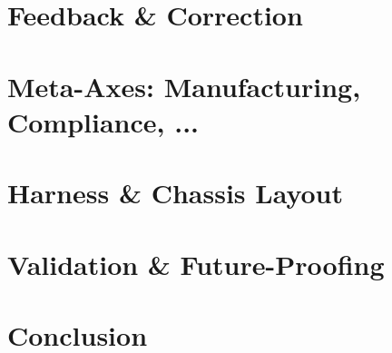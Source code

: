 \documentclass[12pt]{article}
\begin{document}
\section{Feedback \& Correction}


\section{Meta-Axes: Manufacturing, Compliance, ...}

\section{Harness \& Chassis Layout}

\section{Validation \& Future-Proofing}

\section{Conclusion}



\end{document}
